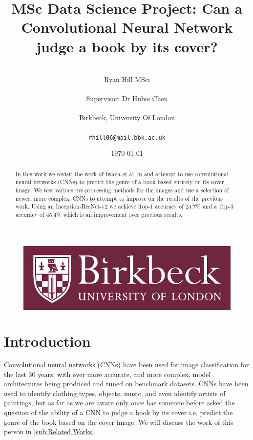 \documentclass[12pt]{article}
\numberwithin{equation}{section}
\numberwithin{figure}{section}
\begin{document}
\renewcommand\citeform[1]{[#1]}
%
\title{MSc Data Science Project: Can a Convolutional Neural Network judge a book by its cover?}
\author{\\Ryan Hill MSci\\\\
Supervisor: Dr Hubie Chen\\\\
Birkbeck, University Of London\\\\
\texttt{rhill06@mail.bbk.ac.uk}}
\date{\today}
\maketitle
\thispagestyle{empty}
\graphicspath{{images/}}
\begin{abstract}
	In this work we revisit the work of Iwana et al.\cite{KenjiIwana} in and attempt to use convolutional neural networks (CNNs) to predict the genre of a book based entirely on its cover image. We test various pre-processing methods for the images and use a selection of newer, more complex, CNNs to attempt to improve on the results of the previous work. Using an Inception-ResNet-v2 we achieve Top-1 accuracy of 24.7\% and a Top-3 accuracy of 45.4\% which is an improvement over previous results.
\end{abstract}
\begin{figure}[!b]
	\centering
	\includegraphics[scale=0.4]{bbk_logo.jpg}
\end{figure}

\clearpage
%
{\hypersetup{linkcolor=black}
\tableofcontents}
\thispagestyle{empty}
\clearpage
%
\setcounter{page}{1}
\section{Introduction} 
\label{sec:intro}
Convolutional neural networks (CNNs) have been used for image classification for the last 30 years\cite{Cun1989}, with ever more accurate, and more complex, model architectures being produced and tuned on benchmark datasets. CNNs have been used to identify clothing types, objects, music, and even identify artists of paintings, but as far as we are aware only once has someone before asked the question of the ability of a CNN to judge a book by its cover i.e. predict the genre of the book based on the cover image. We will discuss the work of this person in \cref{sub:Related Works}. 
\end{document}
